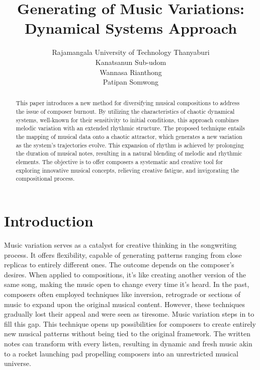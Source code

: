 \documentclass[11pt]{article}
\title{Generating of Music Variations: Dynamical Systems Approach}
\author{Rajamangala University of Technology Thanyaburi\\Kanatsanun Sub-udom\\Wannasa Rianthong\\Patipan Somwong}
\begin{document}
\maketitle

\begin{abstract}
This paper introduces a new method for diversifying musical compositions to address the issue of composer burnout. By utilizing the characteristics of chaotic dynamical systems, well-known for their sensitivity to initial conditions, this approach combines melodic variation with an extended rhythmic structure. The proposed technique entails the mapping of musical data onto a chaotic attractor, which generates a new variation as the system's trajectories evolve. This expansion of rhythm is achieved by prolonging the duration of musical notes, resulting in a natural blending of melodic and rhythmic elements. The objective is to offer composers a systematic and creative tool for exploring innovative musical concepts, relieving creative fatigue, and invigorating the compositional process.
\end{abstract}

\section{Introduction}

Music variation serves as a catalyst for creative thinking in the songwriting process. It offers flexibility, capable of generating patterns ranging from close replicas to entirely different ones. The outcome depends on the composer's desires. When applied to compositions, it's like creating another version of the same song, making the music open to change every time it's heard. In the past, composers often employed techniques like inversion, retrograde or sections of music to expand upon the original musical content. However, these techniques gradually lost their appeal and were seen as tiresome. Music variation steps in to fill this gap. This technique opens up possibilities for composers to create entirely new musical patterns without being tied to the original framework. The written notes can transform with every listen, resulting in dynamic and fresh music akin to a rocket launching pad propelling composers into an unrestricted musical universe.
\end{document}
